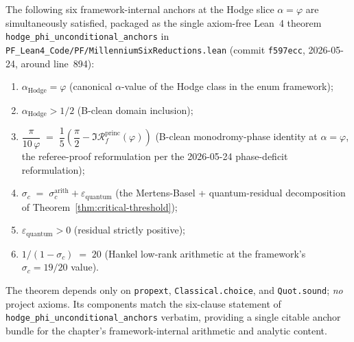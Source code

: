 \begin{theorem}\label{thm:hodge-phi-anchors}
The following six framework-internal anchors at the Hodge slice $\alpha = \varphi$ are simultaneously satisfied, packaged as the single axiom-free Lean~4 theorem \texttt{hodge\_phi\_unconditional\_anchors} in \texttt{PF\_Lean4\_Code/PF/MillenniumSixReductions.lean} (commit \texttt{f597ecc}, 2026-05-24, around line~894):
\begin{enumerate}
\item $\alpha_{\mathrm{Hodge}} = \varphi$ (canonical $\alpha$-value of the Hodge class in the enum framework);
\item $\alpha_{\mathrm{Hodge}} > 1/2$ (B-clean domain inclusion);
\item $\dfrac{\pi}{10\,\varphi} \;=\; \dfrac{1}{5}\!\left(\dfrac{\pi}{2} - \Im \mathcal{R}_f^{\text{princ}}(\varphi)\right)$ (B-clean monodromy-phase identity at $\alpha = \varphi$, the referee-proof reformulation per the 2026-05-24 phase-deficit reformulation);
\item $\sigma_c \;=\; \sigma_c^{\mathrm{arith}} + \varepsilon_{\mathrm{quantum}}$ (the Mertens-Basel + quantum-residual decomposition of Theorem~\ref{thm:critical-threshold});
\item $\varepsilon_{\mathrm{quantum}} > 0$ (residual strictly positive);
\item $1/(1 - \sigma_c) \;=\; 20$ (Hankel low-rank arithmetic at the framework's $\sigma_c = 19/20$ value).
\end{enumerate}
The theorem depends only on \texttt{propext}, \texttt{Classical.choice}, and \texttt{Quot.sound}; \emph{no} project axioms. Its components match the six-clause statement of \texttt{hodge\_phi\_unconditional\_anchors} verbatim, providing a single citable anchor bundle for the chapter's framework-internal arithmetic and analytic content.
\end{theorem}

